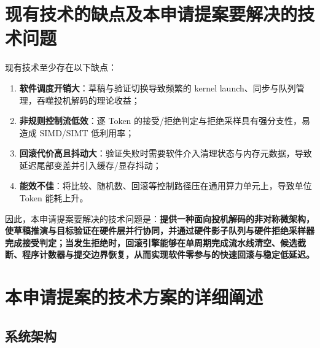 \documentclass[12pt,a4paper]{article}
\begin{document}
\section{现有技术的缺点及本申请提案要解决的技术问题}

现有技术至少存在以下缺点：
\begin{enumerate}
    \item \textbf{软件调度开销大}：草稿与验证切换导致频繁的 kernel launch、同步与队列管理，吞噬投机解码的理论收益；
    \item \textbf{非规则控制流低效}：逐 Token 的接受/拒绝判定与拒绝采样具有强分支性，易造成 SIMD/SIMT 低利用率；
    \item \textbf{回滚代价高且抖动大}：验证失败时需要软件介入清理状态与内存元数据，导致延迟尾部变差并引入缓存/显存抖动；
    \item \textbf{能效不佳}：将比较、随机数、回滚等控制路径压在通用算力单元上，导致单位 Token 能耗上升。
\end{enumerate}

因此，本申请提案要解决的技术问题是：\textbf{提供一种面向投机解码的非对称微架构，使草稿推演与目标验证在硬件层并行协同，并通过硬件影子队列与硬件拒绝采样器完成接受判定；当发生拒绝时，回滚引擎能够在单周期完成流水线清空、候选截断、程序计数器与提交边界恢复，从而实现软件零参与的快速回滚与稳定低延迟。}

\section{本申请提案的技术方案的详细阐述}

\subsection{系统架构}
\end{document}

